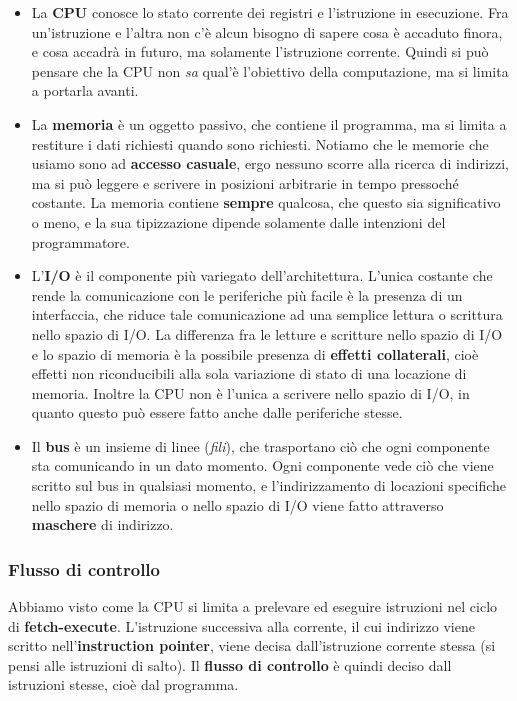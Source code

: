 \documentclass[a4paper,11pt]{article}
\begin{document}
\begin{itemize}
	\item 
La \textbf{CPU} conosce lo stato corrente dei registri e l'istruzione in esecuzione.
Fra un'istruzione e l'altra non c'è alcun bisogno di sapere cosa è accaduto finora, e cosa accadrà in futuro, ma solamente l'istruzione corrente.
Quindi si può pensare che la CPU non \textit{sa} qual'è l'obiettivo della computazione, ma si limita a portarla avanti.

	\item
La \textbf{memoria} è un oggetto passivo, che contiene il programma, ma si limita a restiture i dati richiesti quando sono richiesti.
Notiamo che le memorie che usiamo sono ad \textbf{accesso casuale}, ergo nessuno scorre alla ricerca di indirizzi, ma si può leggere e scrivere in posizioni arbitrarie in tempo pressoché costante.
La memoria contiene \textbf{sempre} qualcosa, che questo sia significativo o meno, e la sua tipizzazione dipende solamente dalle intenzioni del programmatore.
	
	\item
L'\textbf{I/O} è il componente più variegato dell'architettura.
L'unica costante che rende la comunicazione con le periferiche più facile è la presenza di un interfaccia, che riduce tale comunicazione ad una semplice lettura o scrittura nello spazio di I/O.
La differenza fra le letture e scritture nello spazio di I/O e lo spazio di memoria è la possibile presenza di \textbf{effetti collaterali}, cioè effetti non riconducibili alla sola variazione di stato di una locazione di memoria.
Inoltre la CPU non è l'unica a scrivere nello spazio di I/O, in quanto questo può essere fatto anche dalle periferiche stesse.

	\item
Il \textbf{bus} è un insieme di linee (\textit{fili}), che trasportano ciò che ogni componente sta comunicando in un dato momento.
Ogni componente vede ciò che viene scritto sul bus in qualsiasi momento, e l'indirizzamento di locazioni specifiche nello spazio di memoria o nello spazio di I/O viene fatto attraverso \textbf{maschere} di indirizzo. 
\end{itemize}

\subsubsection{Flusso di controllo}
Abbiamo visto come la CPU si limita a prelevare ed eseguire istruzioni nel ciclo di \textbf{fetch-execute}.
L'istruzione successiva alla corrente, il cui indirizzo viene scritto nell'\textbf{instruction pointer}, viene decisa dall'istruzione corrente stessa (si pensi alle istruzioni di salto).
Il \textbf{flusso di controllo} è quindi deciso dall istruzioni stesse, cioè dal programma.
\end{document}
